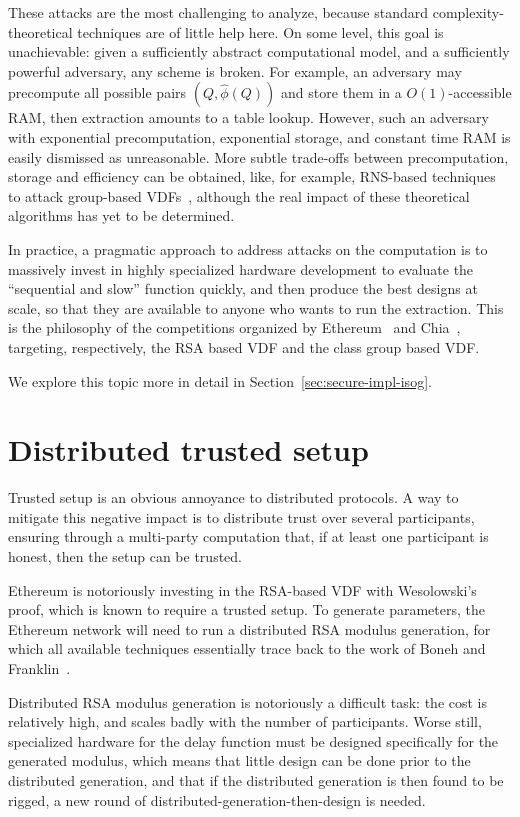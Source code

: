 \documentclass{llncs}
\begin{document}
These attacks are the most challenging to analyze, because standard
complexity-theoretical techniques are of little help here. %
On some level, this goal is unachievable: given a sufficiently
abstract computational model, and a sufficiently powerful adversary,
any scheme is broken. %
For example, an adversary may precompute all possible pairs
$(Q,\hat\phi(Q))$ and store them in a $O(1)$-accessible RAM, then
extraction amounts to a table lookup. %
However, such an adversary with exponential precomputation,
exponential storage, and constant time RAM is easily dismissed as
unreasonable. %
More subtle trade-offs between precomputation, storage and efficiency
can be obtained, like, for example, RNS-based techniques to attack
group-based VDFs~\cite{BernsteinSorenson07}, although the real impact
of these theoretical algorithms has yet to be determined.

In practice, a pragmatic approach to address attacks on the
computation is to massively invest in highly specialized hardware
development to evaluate the ``sequential and slow'' function quickly,
and then produce the best designs at scale, so that they are available
to anyone who wants to run the extraction. %
This is the philosophy of the competitions organized by
Ethereum~\cite{ethereum-vdf} and Chia~\cite{chia-vdf}, targeting,
respectively, the RSA based VDF and the class group based VDF.

We explore this topic more in detail in
Section~\ref{sec:secure-impl-isog}.


\section{Distributed trusted setup}
\label{sec:distr-trust-setup}

Trusted setup is an obvious annoyance to distributed protocols. %
A way to mitigate this negative impact is to distribute trust over
several participants, ensuring through a multi-party computation that,
if at least one participant is honest, then the setup can be trusted.

Ethereum is notoriously investing in the RSA-based VDF with
Wesolowski's proof\cite{ethereum-vdf,Wesolowski}, which is known to
require a trusted setup. %
To generate parameters, the Ethereum network will need to run a
distributed RSA modulus generation, for which all available techniques
essentially trace back to the work of Boneh and
Franklin~\cite{10.1007/BFb0052253}.

Distributed RSA modulus generation is notoriously a difficult task:
the cost is relatively high, and scales badly with the number of
participants. %
Worse still, specialized hardware for the delay function must be
designed specifically for the generated modulus, which means that
little design can be done prior to the distributed generation, and
that if the distributed generation is then found to be rigged, a new
round of distributed-generation-then-design is needed.
\end{document}
